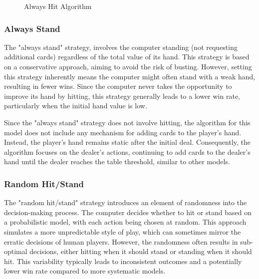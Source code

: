 \documentclass[a4paper,12pt]{report}
\begin{document}
\begin{figure}[H]
\caption{Always Hit Algorithm}
\label{alg:stft}
\end{figure}

\subsubsection{Always Stand} 
The "always stand" strategy, involves the computer standing (not requesting additional cards) regardless of the total value of its hand. This strategy is based on a conservative approach, aiming to avoid the risk of busting. However, setting this strategy inherently means the computer might often stand with a weak hand, resulting in fewer wins. Since the computer never takes the opportunity to improve its hand by hitting, this strategy generally leads to a lower win rate, particularly when the initial hand value is low.

Since the "always stand" strategy does not involve hitting, the algorithm for this model does not include any mechanism for adding cards to the player's hand. Instead, the player's hand remains static after the initial deal. Consequently, the algorithm focuses on the dealer's actions, continuing to add cards to the dealer's hand until the dealer reaches the table threshold, similar to other models.

\subsubsection{Random Hit/Stand} 
The "random hit/stand" strategy introduces an element of randomness into the decision-making process. The computer decides whether to hit or stand based on a probabilistic model, with each action being chosen at random. This approach simulates a more unpredictable style of play, which can sometimes mirror the erratic decisions of human players. However, the randomness often results in sub-optimal decisions, either hitting when it should stand or standing when it should hit. This variability typically leads to inconsistent outcomes and a potentially lower win rate compared to more systematic models.
\end{document}

